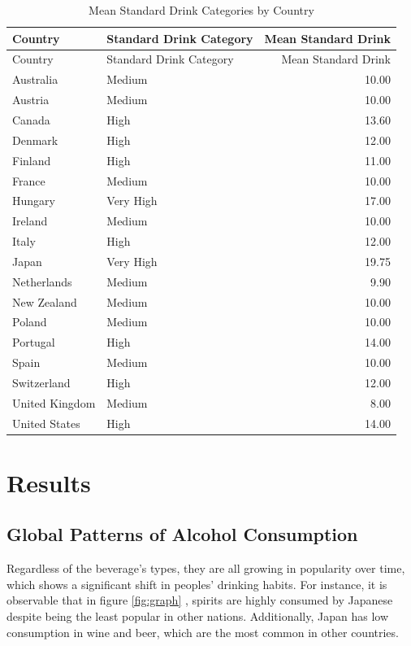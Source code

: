 \documentclass[11pt,a4paper,]{article}
\begin{document}
\begin{longtable}[]{@{}llr@{}}
\caption{\label{tab:table1}Mean Standard Drink Categories by Country}\tabularnewline
\toprule\noalign{}
Country & Standard Drink Category & Mean Standard Drink \\
\midrule\noalign{}
\endfirsthead
\toprule\noalign{}
Country & Standard Drink Category & Mean Standard Drink \\
\midrule\noalign{}
\endhead
\bottomrule\noalign{}
\endlastfoot
Australia & Medium & 10.00 \\
Austria & Medium & 10.00 \\
Canada & High & 13.60 \\
Denmark & High & 12.00 \\
Finland & High & 11.00 \\
France & Medium & 10.00 \\
Hungary & Very High & 17.00 \\
Ireland & Medium & 10.00 \\
Italy & High & 12.00 \\
Japan & Very High & 19.75 \\
Netherlands & Medium & 9.90 \\
New Zealand & Medium & 10.00 \\
Poland & Medium & 10.00 \\
Portugal & High & 14.00 \\
Spain & Medium & 10.00 \\
Switzerland & High & 12.00 \\
United Kingdom & Medium & 8.00 \\
United States & High & 14.00 \\
\end{longtable}

\section{Results}\label{results}

\subsection{Global Patterns of Alcohol Consumption}\label{global-patterns-of-alcohol-consumption}

Regardless of the beverage's types, they are all growing in popularity over time, which shows a significant shift in peoples' drinking habits.
For instance, it is observable that in figure \ref{fig:graph} , spirits are highly consumed by Japanese despite being the least popular in other nations.
Additionally, Japan has low consumption in wine and beer, which are the most common in other countries.
\end{document}

